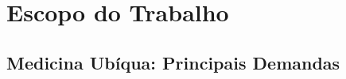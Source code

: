 \documentclass[ppginf, pep]{esinucpel}
\begin{document}
%


\chapter{Escopo do Trabalho}

\section{Medicina Ubíqua: Principais Demandas}
\end{document}
